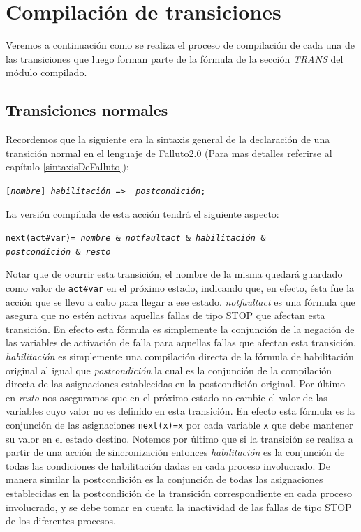 \documentclass[pdftex,a4paper,12pt]{book}
\newcommand{\textff}[1]{\begin{center}\texttt{#1}\end{center}}
\newcommand{\etextit}[1]{\textnormal{\textit{#1}}}
\begin{document}
\section{Compilaci\'on de transiciones}
Veremos a continuaci\'on como se realiza el proceso de compilaci\'on de cada una de las transiciones que luego forman parte de la f\'ormula de la secci\'on \textit{TRANS} del m\'odulo compilado.

\subsection*{Transiciones normales}
Recordemos que la siguiente era la sintaxis general de la declaraci\'on de una transici\'on normal en el lenguaje de Falluto2.0 (Para mas detalles referirse al cap\'itulo \ref{sintaxisDeFalluto}):
\textff{[\etextit{nombre}]~\etextit{habilitaci\'on} => \etextit{ postcondici\'on};}
La versi\'on compilada de esta acci\'on tendr\'a el siguiente aspecto:
\textff{next(act\#var)=\etextit{ nombre}~\&~\etextit{notfaultact}~\&~\etextit{habilitaci\'on}~\&\\\etextit{postcondici\'on}~\&~\etextit{resto}}
Notar que de ocurrir esta transici\'on, el nombre de la misma quedar\'a guardado como valor de \texttt{act\#var} en el pr\'oximo estado, indicando que, en efecto, \'esta fue la acci\'on que se llevo a cabo para llegar a ese estado. \textit{notfaultact} es una f\'ormula que asegura que no est\'en activas aquellas fallas de tipo STOP que afectan esta transici\'on. En efecto esta f\'ormula es simplemente la conjunci\'on de la negaci\'on de las variables de activaci\'on de falla para aquellas fallas que afectan esta transici\'on. \textit{habilitaci\'on} es simplemente una compilaci\'on directa de la f\'ormula de habilitaci\'on original al igual que \textit{postcondici\'on} la cual es la conjunci\'on de la compilaci\'on directa de las asignaciones establecidas en la postcondici\'on original. Por \'ultimo en \textit{resto} nos aseguramos que en el pr\'oximo estado no cambie el valor de las variables cuyo valor no es definido en esta transici\'on. En efecto esta f\'ormula es la conjunci\'on de las asignaciones \texttt{next(x)=x} por cada variable \texttt{x} que debe mantener su valor en el estado destino. Notemos por \'ultimo que si la transici\'on se realiza a partir de una acci\'on de sincronizaci\'on entonces \textit{habilitaci\'on} es la conjunci\'on de todas las condiciones de habilitaci\'on dadas en cada proceso involucrado. De manera similar la postcondici\'on es la conjunci\'on de todas las asignaciones establecidas en la postcondici\'on de la transici\'on correspondiente en cada proceso involucrado, y se debe tomar en cuenta la inactividad de las fallas de tipo STOP de los diferentes procesos.
\end{document}
